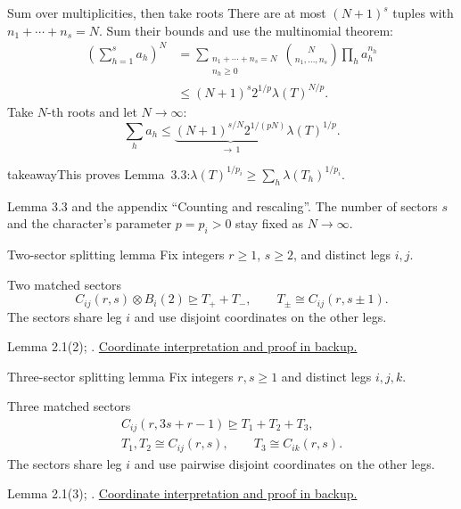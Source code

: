 \documentclass[aspectratio=169,11pt]{beamer}
\newcommand{\degen}{\unrhd}
\newcommand{\source}[1]{\vfill\par{\fontsize{7.5}{9}\selectfont\color{muted}#1\par}}
\newcommand{\takeaway}[1]{\begin{beamercolorbox}[sep=0.65em,wd=\linewidth]{takeaway}#1\end{beamercolorbox}}
\begin{document}
\begin{frame}{Sum over multiplicities, then take roots}
  There are at most $(N+1)^s$ tuples with $n_1+\cdots+n_s=N$.
  Sum their bounds and use the multinomial theorem:
  \[
  \begin{aligned}
    \left(\sum_{h=1}^{s}a_h\right)^N
      &=\sum_{\substack{n_1+\cdots+n_s=N\\n_h\ge0}}
        \binom{N}{n_1,\ldots,n_s}\prod_h a_h^{n_h}\\
      &\le(N+1)^s2^{1/p}\lambda(T)^{N/p}.
  \end{aligned}
  \]
  Take $N$-th roots and let $N\to\infty$:
  \[
    \sum_h a_h\le
      \underbrace{(N+1)^{s/N}2^{1/(pN)}}_{\longrightarrow\,1}
      \lambda(T)^{1/p}.
  \]
  \takeaway{This proves Lemma~3.3:\quad$\displaystyle
    \lambda(T)^{1/p_i}\ge\sum_h\lambda(T_h)^{1/p_i}.
  $}
  \source{Lemma 3.3 and the appendix ``Counting and rescaling''.
  The number of sectors $s$ and the character's parameter $p=p_i>0$
  stay fixed as $N\to\infty$.}
\end{frame}

\begin{frame}[label=two-sector-splitting]{Two-sector splitting lemma}
  Fix integers $r\ge1$, $s\ge2$, and distinct legs $i,j$.
  \begin{block}{Two matched sectors}
    \[
      C_{ij}(r,s)\otimes B_i(2)\degen T_++T_-,
      \qquad T_\pm\cong C_{ij}(r,s\pm1).
    \]
    The sectors share leg $i$ and use disjoint coordinates on the other legs.
  \end{block}
  \source{Lemma 2.1(2); \cite[Lemma 4.1]{nine-fourths}.
  \hyperlink{two-sector-proof}{Coordinate interpretation and proof in backup.}}
\end{frame}

\begin{frame}[label=three-sector-splitting]{Three-sector splitting lemma}
  Fix integers $r,s\ge1$ and distinct legs $i,j,k$.
  \begin{block}{Three matched sectors}
    \[
    \begin{gathered}
      C_{ij}(r,3s+r-1)\degen T_1+T_2+T_3,\\
      T_1,T_2\cong C_{ij}(r,s),\qquad T_3\cong C_{ik}(r,s).
    \end{gathered}
    \]
    The sectors share leg $i$ and use pairwise disjoint coordinates
    on the other legs.
  \end{block}
  \source{Lemma 2.1(3); \cite[Lemma 4.2]{nine-fourths}.
  \hyperlink{three-sector-proof}{Coordinate interpretation and proof in backup.}}
\end{frame}
\end{document}
